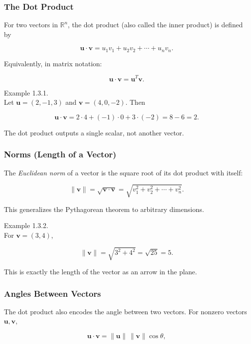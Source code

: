 \documentclass[
  12pt,
  a4paper,
]{article}
\begin{document}
\subsubsection{The Dot Product}\label{the-dot-product}

For two vectors in \(\mathbb{R}^n\), the dot product (also called the
inner product) is defined by

\[\mathbf{u} \cdot \mathbf{v} = u_1 v_1 + u_2 v_2 + \cdots + u_n v_n.\]

Equivalently, in matrix notation:

\[\mathbf{u} \cdot \mathbf{v} = \mathbf{u}^T \mathbf{v}.\]

Example 1.3.1.\\
Let \(\mathbf{u} = (2, -1, 3)\) and \(\mathbf{v} = (4, 0, -2)\). Then

\[\mathbf{u} \cdot \mathbf{v} = 2\cdot 4 + (-1)\cdot 0 + 3\cdot (-2) = 8 - 6 = 2.\]

The dot product outputs a single scalar, not another vector.

\subsubsection{Norms (Length of a
Vector)}\label{norms-length-of-a-vector}

The \emph{Euclidean norm} of a vector is the square root of its dot
product with itself:

\[\|\mathbf{v}\| = \sqrt{\mathbf{v} \cdot \mathbf{v}} = \sqrt{v_1^2 + v_2^2 + \cdots + v_n^2}.\]

This generalizes the Pythagorean theorem to arbitrary dimensions.

Example 1.3.2.\\
For \(\mathbf{v} = (3, 4)\),

\[\|\mathbf{v}\| = \sqrt{3^2 + 4^2} = \sqrt{25} = 5.\]

This is exactly the length of the vector as an arrow in the plane.

\subsubsection{Angles Between Vectors}\label{angles-between-vectors}

The dot product also encodes the angle between two vectors. For nonzero
vectors \(\mathbf{u}, \mathbf{v}\),

\[\mathbf{u} \cdot \mathbf{v} = \|\mathbf{u}\| \, \|\mathbf{v}\| \cos \theta,\]
\end{document}
